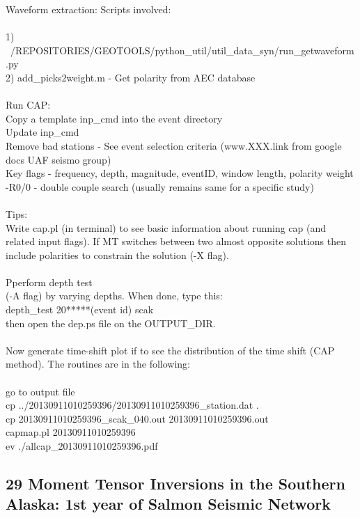 \documentclass[11pt,titlepage,fleqn]{article}
\begin{document}
Waveform extraction: 
Scripts involved:
\\
\\
1) ~/REPOSITORIES/GEOTOOLS/python\_util/util\_data\_syn/run\_getwaveform.py \\
2) add\_picks2weight.m - Get polarity from AEC database
\\
\\
Run CAP:\\
Copy a template inp\_cmd into the event directory\\
Update inp\_cmd \\
Remove bad stations - See event selection criteria (www.XXX.link from google docs UAF seismo group)\\
Key flags - frequency, depth, magnitude, eventID, window length, polarity weight\\
-R0/0 - double couple search (usually remains same for a specific study)
\\
\\
Tips:\\
Write cap.pl (in terminal) to see basic information about running cap (and related input flags).
If MT switches between two almost opposite solutions then include polarities to constrain the solution (-X flag).
\\
\\
Pperform depth test\\
 (-A flag) by varying depths. When done, type this: \\
depth\_test 20*****(event id) scak \\
then open the dep.ps file on the OUTPUT\_DIR.\\
\\
Now generate time-shift plot if to see the distribution of the time shift (CAP method). The routines are in the following:
\\ \\
go to output file \\
cp ../20130911010259396/20130911010259396\_station.dat . \\
cp 20130911010259396\_scak\_040.out 20130911010259396.out \\
capmap.pl 20130911010259396 \\
ev ./allcap\_20130911010259396.pdf \\



\subsection*{29 Moment Tensor Inversions in the Southern Alaska: 1st year of Salmon Seismic Network}
\end{document}
